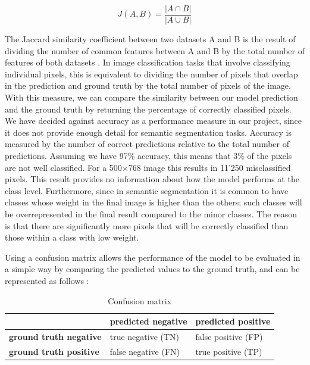 \documentclass[12pt,a4paper]{scrartcl}
\begin{document}
\begin{equation}
\label{eqn:Jaccard}
J(A,B) = \frac{|A\cap B|}{|A\cup B|}
\end{equation}

The Jaccard similarity coefficient between two datasets A and B is the result of dividing the number of common features between A and B by the total number of features of both datasets \cite{Niwattanakul2013}.
In image classification tasks that involve classifying individual pixels, this is equivalent to dividing  the number of pixels that overlap in the prediction and ground truth by the total number of pixels of the image. With this measure, we can compare the similarity between our model prediction and the ground truth by returning the percentage of correctly classified pixels. 
We have decided against accuracy as a performance measure in our project, since it does not provide enough detail for semantic segmentation tasks. Accuracy is measured by the number of correct predictions relative to the total number of predictions. Assuming we have 97\% accuracy, this means that 3\% of the pixels are not well classified. For a 500$\times$768 image this results in 11'250 misclassified pixels. This result provides no information about how the model performs at the class level. Furthermore, since in semantic segmentation it is common to have classes whose weight in the final image is higher than the others; such classes will be overrepresented in the final result compared to the minor classes. The reason is that  there are significantly more pixels that will be correctly classified than those within a class with low weight. 

Using a confusion matrix allows the performance of the model to be evaluated in a simple way by comparing the predicted values to the ground truth, and can be represented as follows \cite{ConfusionMatrix}:
    \begin{table}[H]
        \begin{tabular}{lll}
        \cline{2-3}
            \multicolumn{1}{l|}{}                                 & \multicolumn{1}{l|}{\textbf{predicted negative}} & \multicolumn{1}{l|}{\textbf{predicted positive}} \\ \hline
            \multicolumn{1}{|l|}{\textbf{ground truth negative}} & \multicolumn{1}{l|}{true negative (TN)}          & \multicolumn{1}{l|}{false positive (FP)}         \\ \hline
            \multicolumn{1}{|l|}{\textbf{ground truth positive}}  & \multicolumn{1}{l|}{false negative (FN)}         & \multicolumn{1}{l|}{true positive (TP)}          \\ \hline
        \end{tabular}
        \caption{Confusion matrix}
    \end{table}
\end{document}
